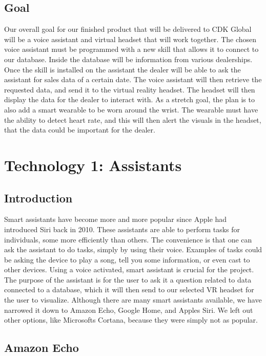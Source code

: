 \documentclass[onecolumn, draftclsnofoot,10pt, compsoc]{IEEEtran}
\begin{document}
	\subsection{Goal}
		Our overall goal for our finished product that will be delivered to CDK Global will be a voice assistant and virtual headset that will work together. The chosen voice assistant must be programmed
		with a new skill that allows it to connect to our database. Inside the database will be information from various dealerships. Once the skill is installed on the assistant the dealer will be able to ask
		the assistant for sales data of a certain date. The voice assistant will then retrieve the requested data, and send it to the virtual reality headset. The headset will then display the data for the dealer to interact
		with. As a stretch goal, the plan is to also add a smart wearable to be worn around the wrist. The wearable must have the ability to detect heart rate, and this will then alert the visuals in the headset, that the data could be
		important for the dealer.


\section{Technology 1: Assistants}
	\subsection{Introduction}
	
		Smart assistants have become more and more popular since Apple had introduced Siri back in 2010. These assistants are able to perform tasks for individuals, some more efficiently than others. 
		The convenience is that one can ask the assistant to do tasks, simply by using their voice. Examples of tasks could be asking the device to play a song, tell you some information, or even cast 
		to other devices. Using a voice activated, smart assistant is crucial for the project. The purpose of the assistant is for the user to ask it a question related to data connected to a database, which it will then 
		send to our selected VR headset for the user to visualize.  Although there are many smart assistants available, we have narrowed it down to Amazon Echo, Google Home, and Apples Siri. We left out 
		other options, like Microsofts Cortana, because they were simply not as popular. 
	
	\subsection{Amazon Echo}
	
\end{document}
